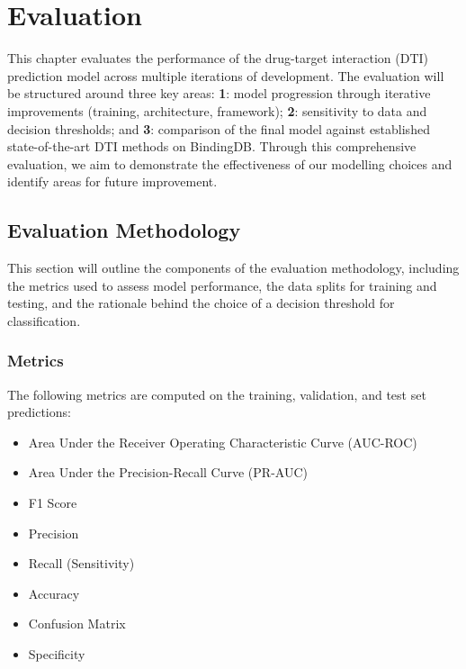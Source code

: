 \chapter{Evaluation}
\label{ch:-evaluation}

This chapter evaluates the performance of the drug-target interaction (DTI) prediction model across multiple iterations of development.
The evaluation will be structured around three key areas: \textbf{1}: model progression through iterative improvements (training, architecture, framework); \textbf{2}: sensitivity to data and decision thresholds; and \textbf{3}: comparison of the final model against established state-of-the-art DTI methods on BindingDB.
Through this comprehensive evaluation, we aim to demonstrate the effectiveness of our modelling choices and identify areas for future improvement.

\section{Evaluation Methodology}
\label{sec: eval_methodology}
This section will outline the components of the evaluation methodology, including the metrics used to assess model performance, the data splits for training and testing, and the rationale behind the choice of a decision threshold for classification.
    \subsection{Metrics}
    \label{sec: eval_metrics}
    The following metrics are computed on the training, validation, and test set predictions:    \begin{itemize}
        \item Area Under the Receiver Operating Characteristic Curve (AUC-ROC)
        \item Area Under the Precision-Recall Curve (PR-AUC)
        \item F1 Score
        \item Precision
        \item Recall (Sensitivity)
        \item Accuracy
        \item Confusion Matrix
        \item Specificity
    \end{itemize}

